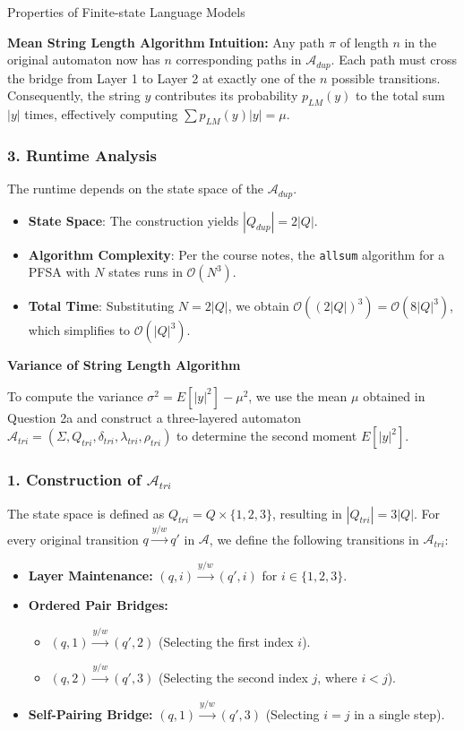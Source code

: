 \begin{question}{Properties of Finite-state Language Models}
\begin{subquestion}{\textbf{Mean String Length Algorithm}}
\textbf{Intuition:} Any path $\pi$ of length $n$ in the original automaton now has $n$ corresponding paths in $\mathcal{A}_{dup}$. Each path must cross the bridge from Layer 1 to Layer 2 at exactly one of the $n$ possible transitions. Consequently, the string $y$ contributes its probability $p_{LM}(y)$ to the total sum $|y|$ times, effectively computing $\sum p_{LM}(y)|y| = \mu$.

\subsubsection*{3. Runtime Analysis}
The runtime depends on the state space of the $\mathcal{A}_{dup}$. 
\begin{itemize}
    \item \textbf{State Space}: The construction yields $|Q_{dup}| = 2|Q|$.
    \item \textbf{Algorithm Complexity}: Per the course notes, the \texttt{allsum} algorithm for a PFSA with $N$ states runs in $\mathcal{O}(N^3)$.
    \item \textbf{Total Time}: Substituting $N = 2|Q|$, we obtain $\mathcal{O}((2|Q|)^3) = \mathcal{O}(8|Q|^3)$, which simplifies to $\mathcal{O}(|Q|^3)$.
\end{itemize}

\end{subquestion}

\begin{subquestion}{\textbf{Variance of String Length Algorithm}}

To compute the variance $\sigma^2 = E[|y|^2] - \mu^2$, we use the mean $\mu$ obtained in Question 2a and construct a three-layered automaton $\mathcal{A}_{tri} = (\Sigma, Q_{tri}, \delta_{tri}, \lambda_{tri}, \rho_{tri})$ to determine the second moment $E[|y|^2]$.

\subsubsection*{1. Construction of $\mathcal{A}_{tri}$}
The state space is defined as $Q_{tri} = Q \times \{1, 2, 3\}$, resulting in $|Q_{tri}| = 3|Q|$. For every original transition $q \xrightarrow{y/w} q'$ in $\mathcal{A}$, we define the following transitions in $\mathcal{A}_{tri}$:
\begin{itemize}
    \item \textbf{Layer Maintenance:} $(q, i) \xrightarrow{y/w} (q', i)$ for $i \in \{1, 2, 3\}$.
    \item \textbf{Ordered Pair Bridges:} 
    \begin{itemize}
        \item $(q, 1) \xrightarrow{y/w} (q', 2)$ (Selecting the first index $i$).
        \item $(q, 2) \xrightarrow{y/w} (q', 3)$ (Selecting the second index $j$, where $i < j$).
    \end{itemize}
    \item \textbf{Self-Pairing Bridge:} $(q, 1) \xrightarrow{y/w} (q', 3)$ (Selecting $i = j$ in a single step).
\end{itemize}


\end{subquestion}
\end{question}
